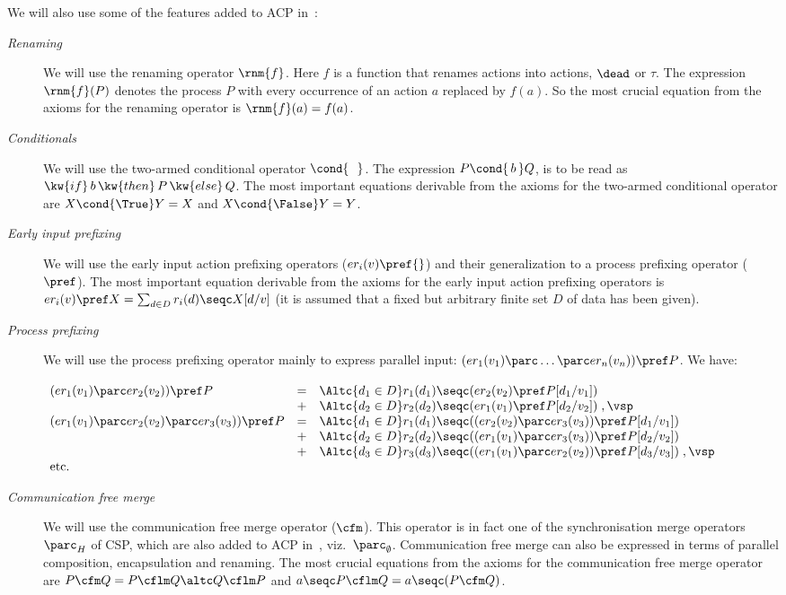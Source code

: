 \documentclass[fleqn]{llncs}
\begin{document}
We will also use some of the features added to ACP in~\cite{BB94a}:
\begin{description}
\item[\it Renaming]
We will use the renaming operator $\rnm{f}$.
Here $f$ is a function that renames actions into actions, $\dead$ or
$\tau$.
The expression $\rnm{f}(P)$ denotes the process $P$ with every occurrence
of an action $a$ replaced by $f(a)$.
So the most crucial equation from the axioms for the renaming operator is 
$\rnm{f}(a) = f(a)$.
\item[\it Conditionals]
We will use the two-armed conditional operator $\cond{\ \ }$.
The expression $P \cond{\,b\,} Q$, is to be read as
$\kw{if}\, b\, \kw{then}\, P\, \kw{else}\, Q$.
The most important equations derivable from the axioms for the two-armed 
conditional operator are $X \cond{\True} Y = X$ and 
$X \cond{\False} Y = Y$.
\item[\it Early input prefixing]
We will use the early input action prefixing operators \sloppy
($er_i(v) \pref {}$) and their generalization to a process prefixing 
operator ($\pref$).
The most important equation derivable from the axioms for the early 
input action prefixing operators is 
$er_i(v) \pref X = \sum_{d \in D} r_i(d) \seqc X[d/v]$ (it is assumed 
that a fixed but arbitrary finite set $D$ of data has been given).
\item[\it Process prefixing]
We will use the process prefixing operator mainly to express parallel input:
$(er_1(v_1) \parc \dots \parc er_n(v_n)) \pref P$.
We have:
\begin{center}
\footnotesize
$
\begin{array}[t]{lll}
(er_1(v_1) \parc er_2(v_2)) \pref P
 & = & \Altc{d_1 \in D} r_1(d_1) \seqc (er_2(v_2) \pref P[d_1/v_1]) \\
 & + & \Altc{d_2 \in D} r_2(d_2) \seqc (er_1(v_1) \pref P[d_2/v_2])\;,
\vsp \\
(er_1(v_1) \parc er_2(v_2) \parc er_3(v_3)) \pref P
 & = & \Altc{d_1 \in D} r_1(d_1)\seqc((er_2(v_2) \parc
                           er_3(v_3)) \pref P[d_1/v_1]) \\
 & + & \Altc{d_2 \in D} r_2(d_2)\seqc((er_1(v_1) \parc
                           er_3(v_3)) \pref P[d_2/v_2]) \\
 & + & \Altc{d_3 \in D} r_3(d_3)\seqc((er_1(v_1) \parc
                           er_2(v_2)) \pref P[d_3/v_3])\;,
\vsp \\
\mbox{etc.}
\end{array}
$
\end{center}
\item[\it Communication free merge]
We will use the communication free merge operator ($\cfm$). 
This operator is in fact one of the synchronisation merge operators 
$\parc_H$ of CSP, which are also added to ACP in~\cite{BB94a}, viz.\  
$\parc_\emptyset$.
Communication free merge can also be expressed in terms of parallel
composition, encapsulation and renaming.
The most crucial equations from the axioms for the communication free 
merge operator are $P \cfm Q = P \cflm Q \altc Q \cflm P$ and
$a \seqc P \cflm Q = a \seqc (P \cfm Q)$.
\end{description}
\end{document}
